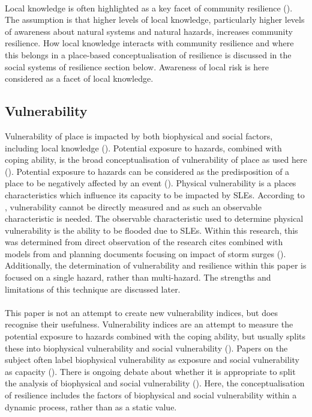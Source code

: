 \paragraph{}

Local knowledge is often highlighted as a key facet of community resilience (\cite{setten_we_2019}). The assumption is that higher levels of local knowledge, particularly higher levels of awareness about natural systems and natural hazards, increases community resilience.  How local knowledge interacts with community resilience and where this belongs in a place-based conceptualisation of resilience is discussed in the social systems of resilience section below. Awareness of local risk is here considered as a facet of local knowledge.  


 
\subsection{Vulnerability}
Vulnerability of place is impacted by both biophysical and social factors, including local knowledge (\cite{opach_seeking_2020}).  Potential exposure to hazards, combined with coping ability, is the broad conceptualisation of vulnerability of place as used here (\cite{rygel_method_2006}). Potential exposure to hazards can be considered as the predisposition of a place to be negatively affected by an event (\cite{lujala_quantifying_2014}).  Physical vulnerability is a places characteristics which influence its capacity to be impacted by SLEs. According to \cite{rod_integrated_2012}, vulnerability cannot be directly measured and as such an observable characteristic is needed.  The observable characteristic used to determine physical vulnerability is the ability to be flooded due to SLEs. Within this research, this was determined from direct observation of the research cites combined with models from \cite{kartverket_se_2020} and planning documents focusing on impact of storm surges (\cite{miljoenheten_og_byplankontoret_trondheim_kommune_9-notat-om-havnivastigning-og-stormflo---hensyn-i-arealplanlegging-nyhavnapdf_2020}). Additionally, the determination of vulnerability and resilience within this paper is focused on a single hazard, rather than multi-hazard. The strengths and limitations of this technique are discussed later. 
\paragraph{}
This paper is not an attempt to create new vulnerability indices, but does recognise their usefulness. Vulnerability indices are an attempt to measure the potential exposure to hazards combined with the coping ability, but usually splits these into biophysical vulnerability  and social vulnerability (\cite{rod_integrated_2012}). Papers on the subject often label biophysical vulnerability as exposure and social vulnerability as capacity (\cite{rod_integrated_2012}). There is ongoing debate about whether it is appropriate to split the analysis of biophysical and social vulnerability (\cite{lujala_quantifying_2014}). Here, the conceptualisation of resilience includes the factors of biophysical and social vulnerability within a dynamic process, rather than as a static value.

